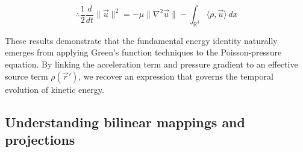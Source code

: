 \documentclass[12pt]{article}
\begin{document}
\[\therefore \frac{1}{2}\frac{d}{dt} \|\vec u\|^{2} = -\mu \|\nabla^{2} \vec u\| - \int_{\mathbb{R}^{3}}\langle \rho, \vec u \rangle\,dx\]

\begin{remark}
    These results demonstrate that the fundamental energy identity naturally emerges from applying Green’s function techniques to the Poisson-pressure equation. By linking the acceleration term and pressure gradient to an effective source term $\rho(\vec r')$, we recover an expression that governs the temporal evolution of kinetic energy.
\end{remark}

\subsection{Understanding bilinear mappings and projections}






\end{document}
